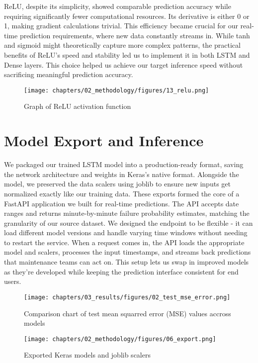 ReLU, despite its simplicity, showed comparable prediction accuracy while requiring significantly fewer computational resources. Its derivative is either 0 or 1, making gradient calculations trivial. This efficiency became crucial for our real-time prediction requirements, where new data constantly streams in. While tanh and sigmoid might theoretically capture more complex patterns, the practical benefits of ReLU's speed and stability led us to implement it in both LSTM and Dense layers. This choice helped us achieve our target inference speed without sacrificing meaningful prediction accuracy.

\begin{figure}[H]
    \centering
    \texttt{[image: chapters/02\_methodology/figures/13\_relu.png]}
    \caption{Graph of ReLU activation function}
    \label{fig:relu-graph}
\end{figure}

\section{Model Export and Inference}
We packaged our trained LSTM model into a production-ready format, saving the network architecture and weights in Keras's native format. Alongside the model, we preserved the data scalers using joblib to ensure new inputs get normalized exactly like our training data. These exports formed the core of a FastAPI application we built for real-time predictions. The API accepts date ranges and returns minute-by-minute failure probability estimates, matching the granularity of our source dataset. We designed the endpoint to be flexible - it can load different model versions and handle varying time windows without needing to restart the service. When a request comes in, the API loads the appropriate model and scalers, processes the input timestamps, and streams back predictions that maintenance teams can act on. This setup lets us swap in improved models as they're developed while keeping the prediction interface consistent for end users.

\begin{figure}[H]
    \centering
    \texttt{[image: chapters/03\_results/figures/02\_test\_mse\_error.png]}
    \caption{Comparison chart of test mean squarred error (MSE) values accross models}
    \label{fig:test-mse-error}
\end{figure}

\begin{figure}[H]
    \centering
    \texttt{[image: chapters/02\_methodology/figures/06\_export.png]}
    \caption{Exported Keras models and joblib scalers}
\end{figure}

